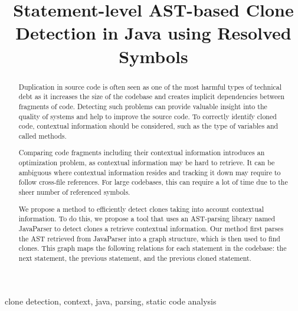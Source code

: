 \documentclass[conference]{IEEEtran}
\begin{document}
\title{Statement-level AST-based Clone Detection in Java using Resolved Symbols}
\author{
}

\maketitle

\thispagestyle{plain}
\pagestyle{plain}

\begin{abstract}
Duplication in source code is often seen as one of the most harmful types of technical debt as it increases the size of the codebase and creates implicit dependencies between fragments of code. Detecting such problems can provide valuable insight into the quality of systems and help to improve the source code. To correctly identify cloned code, contextual information should be considered, such as the type of variables and called methods.

Comparing code fragments including their contextual information introduces an optimization problem, as contextual information may be hard to retrieve. It can be ambiguous where contextual information resides and tracking it down may require to follow cross-file references. For large codebases, this can require a lot of time due to the sheer number of referenced symbols.

We propose a method to efficiently detect clones taking into account contextual information. To do this, we propose a tool that uses an AST-parsing library named JavaParser to detect clones a retrieve contextual information. Our method first parses the AST retrieved from JavaParser into a graph structure, which is then used to find clones. This graph maps the following relations for each statement in the codebase: the next statement, the previous statement, and the previous cloned statement.
\end{abstract}

\begin{IEEEkeywords}
clone detection, context, java, parsing, static code analysis
\end{IEEEkeywords}
\end{document}
